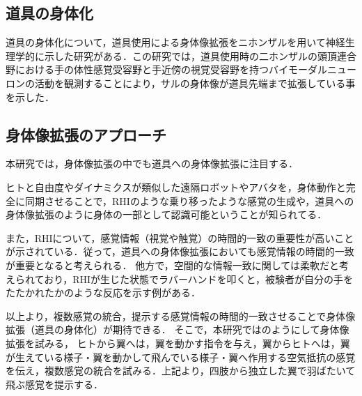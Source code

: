 \begin{small}
    \subsection{道具の身体化} %
      道具の身体化について，道具使用による身体像拡張をニホンザルを用いて神経生理学的に示した研究がある\cite{iriki1996coding}．この研究では，道具使用時の二ホンザルの頭頂連合野における手の体性感覚受容野と手近傍の視覚受容野を持つバイモーダルニューロンの活動を観測することにより，サルの身体像が道具先端まで拡張している事を示した．



  \subsection{身体像拡張のアプローチ} 
    本研究では，身体像拡張の中でも道具への身体像拡張に注目する．

    ヒトと自由度やダイナミクスが類似した遠隔ロボットやアバタを，身体動作と完全に同期させることで，RHIのような乗り移ったような感覚の生成や，道具への身体像拡張のように身体の一部として認識可能ということが知られてる．

    また，RHIについて，感覚情報（視覚や触覚）の時間的一致の重要性が高いことが示されている\cite{ehrsson2007experimental}．従って，道具への身体像拡張においても感覚情報の時間的一致が重要となると考えられる．
    他方で，空間的な情報一致に関しては柔軟だと考えられており，RHIが生じた状態でラバーハンドを叩くと，被験者が自分の手をたたかれたかのような反応を示す例がある\cite{armel2003projecting}．


    以上より，複数感覚の統合，提示する感覚情報の時間的一致させることで身体像拡張（道具の身体化）が期待できる．
    そこで，本研究ではのようにして身体像拡張を試みる，
    ヒトから翼へは，翼を動かす指令を与え，翼からヒトへは，翼が生えている様子・翼を動かして飛んでいる様子・翼へ作用する空気抵抗の感覚を伝え，複数感覚の統合を試みる．上記より，四肢から独立した翼で羽ばたいて飛ぶ感覚を提示する．



\end{small}
